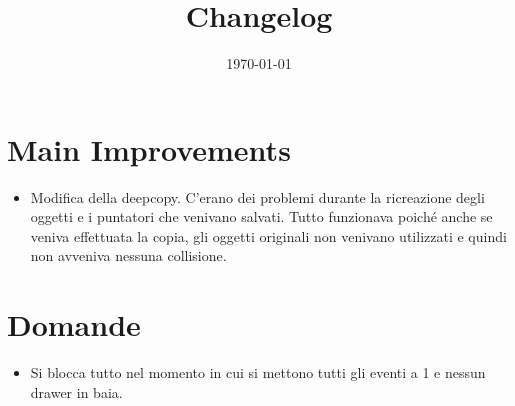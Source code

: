 \documentclass[a4paper]{article}
\begin{document}
	\title{Changelog}
	\date{\today}
	\maketitle
	
	\newpage
	
	\section*{Main Improvements}
	\begin{itemize}[label=]
		\item Modifica della \textsf{deepcopy}. C'erano dei problemi durante la ricreazione degli oggetti e i puntatori che venivano salvati. Tutto funzionava poiché anche se veniva effettuata la copia, gli oggetti originali non venivano utilizzati e quindi non avveniva nessuna collisione.
	\end{itemize}
	
	\section*{Domande}
	\begin{itemize}
		\item Si blocca tutto nel momento in cui si mettono tutti gli eventi a 1 e nessun drawer in baia.
	\end{itemize}
\end{document}
